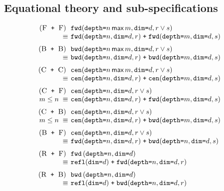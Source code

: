 \documentclass[9pt]{sigplanconf}
\theoremstyle{definition}
\newcommand{\term}[1]{\texttt{#1}}
\newcommand{\stenFwdS}[2]{\term{fwd} \, (\term{depth=}#1,
  \term{dim=}#2)}
\newcommand{\stenBwdS}[2]{\term{bwd} \, (\term{depth=}#1,
  \term{dim=}#2)}
\newcommand{\stenFwdSR}[3]{\term{fwd} (\term{depth=}#1,
  \term{dim=}#2, #3)}
\newcommand{\stenBwdSR}[3]{\term{bwd} (\term{depth=}#1,
  \term{dim=}#2, #3)}
\newcommand{\stenCenSR}[3]{\term{cen} (\term{depth=}#1,
  \term{dim=}#2, #3)}
\newcommand{\stenReflSR}[1]{\term{refl} (\term{dim=}#1)}
\begin{document}
\subsection{Equational theory and sub-specifications}
\label{sec:eqs}

\begin{figure}
\begin{align*}
\setlength{\arraycolsep}{0.05em}
\begin{array}{c}
\begin{array}{rll}
(\textsc{F\, \texttt{+} \,F}) \;\; &
\stenFwdSR{n \, \textsf{max} \, m}{d}{r \vee s} \\
 \equiv \; & \stenFwdSR{n}{d}{r} \; \texttt{+} \; \stenFwdSR{m}{d}{s} \\[0.6em]
%
%
(\textsc{B\, \texttt{+} \,B}) \;\; &
\stenBwdSR{n \, \textsf{max} \, m}{d}{r \vee s} \\
 \equiv \; & \stenBwdSR{n}{d}{r} \; \texttt{+} \; \stenBwdSR{m}{d}{s} \\[0.6em]
%
%
(\textsc{C\, \texttt{+} \,C}) \;\; &
\stenCenSR{n \, \textsf{max} \, m}{d}{r \vee s} \\
\equiv \; & \stenCenSR{n}{d}{r} \; \texttt{+} \; \stenCenSR{m}{d}{s} \\[0.6em]
%
%
(\textsc{C\, \texttt{+} \,F}) \;\; & \stenCenSR{n}{d}{r \vee s} \\
\textit{$m \leq n$} \; \equiv \; & \stenCenSR{n}{d}{r} \; \texttt{+} \;
                      \stenFwdSR{m}{d}{s} \\[0.6em]
%
%
(\textsc{C\, \texttt{+} \,B}) \;\; &
\stenCenSR{n}{d}{r \vee s} \\
\textit{$m \leq n$} \; \equiv \; & \stenCenSR{n}{d}{r} \; \texttt{+} \;
                      \stenBwdSR{m}{d}{s} \\[0.6em]
%
%
(\textsc{B\, \texttt{+} \,F}) \;\; &
\stenCenSR{n}{d}{r \vee s} \\
\equiv \; & \stenFwdSR{n}{d}{r} \; \texttt{+} \; \stenBwdSR{n}{d}{s}
  \\[0.6em]
%
%
(\textsc{R\, \texttt{+} \,F}) \;\; &
\stenFwdS{n}{d} \\
\equiv \; & \stenReflSR{d} \; \texttt{+} \; \stenFwdSR{n}{d}{r} \\[0.6em]
%
%
(\textsc{R\, \texttt{+} \,B}) \;\; &
\stenBwdS{n}{d} \\
\equiv \; & \stenReflSR{d} \; \texttt{+} \; \stenBwdSR{n}{d}{r} \\[0.6em]

\end{array}
\end{array}
\end{align*}
\end{figure}
\end{document}
